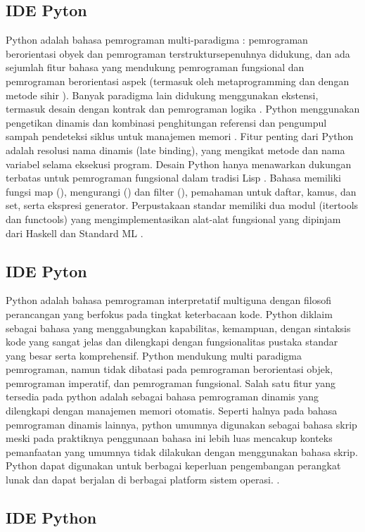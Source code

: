 \subsection{IDE Pyton}
Python adalah bahasa pemrograman multi-paradigma : pemrograman berorientasi obyek dan pemrograman terstruktursepenuhnya didukung, dan ada sejumlah fitur bahasa yang mendukung pemrograman fungsional dan pemrograman berorientasi aspek (termasuk oleh metaprogramming dan dengan metode sihir ).  Banyak paradigma lain didukung menggunakan ekstensi, termasuk desain dengan kontrak  dan pemrograman logika .
Python menggunakan pengetikan dinamis dan kombinasi penghitungan referensi dan pengumpul sampah pendeteksi siklus untuk manajemen memori . Fitur penting dari Python adalah resolusi nama dinamis (late binding), yang mengikat metode dan nama variabel selama eksekusi program.
Desain Python hanya menawarkan dukungan terbatas untuk pemrograman fungsional dalam tradisi Lisp . Bahasa memiliki fungsi map (), mengurangi () dan filter (), pemahaman untuk daftar, kamus, dan set, serta ekspresi generator. Perpustakaan standar memiliki dua modul (itertools dan functools) yang mengimplementasikan alat-alat fungsional yang dipinjam dari Haskell dan Standard ML . \cite{van2007python}

\subsection{IDE Pyton}
Python adalah bahasa pemrograman interpretatif multiguna dengan filosofi perancangan yang berfokus pada tingkat keterbacaan kode. Python diklaim sebagai bahasa yang menggabungkan kapabilitas, kemampuan, dengan sintaksis kode yang sangat jelas dan dilengkapi dengan fungsionalitas pustaka standar yang besar serta komprehensif. Python mendukung multi paradigma pemrograman, namun tidak dibatasi pada pemrograman berorientasi objek, pemrograman imperatif, dan pemrograman fungsional. Salah satu fitur yang tersedia pada python adalah sebagai bahasa  
pemrograman dinamis yang dilengkapi dengan manajemen memori otomatis. Seperti halnya pada bahasa pemrograman dinamis lainnya, python umumnya digunakan sebagai bahasa skrip meski pada praktiknya penggunaan bahasa ini lebih luas mencakup konteks pemanfaatan yang umumnya tidak dilakukan dengan menggunakan bahasa skrip. Python dapat digunakan untuk berbagai keperluan pengembangan perangkat lunak dan dapat berjalan di berbagai platform sistem operasi. \cite{rosmalasarana}.

\subsection{IDE Python}

